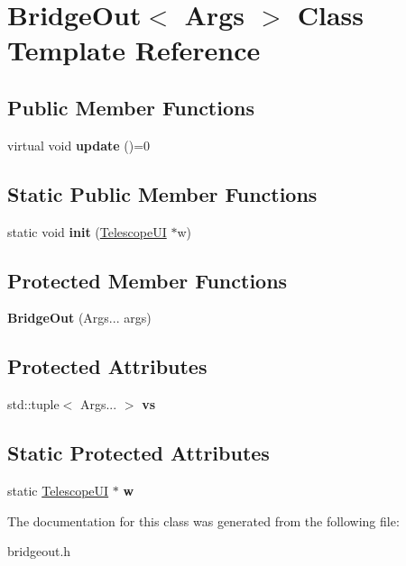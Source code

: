 \hypertarget{classBridgeOut}{}\section{Bridge\+Out$<$ Args $>$ Class Template Reference}
\label{classBridgeOut}
\subsection*{Public Member Functions}
\begin{DoxyCompactItemize}
\item 
\mbox{\label{classBridgeOut_ad87aac4b8b859708b67a07b2b626ed90}} 
virtual void {\bfseries update} ()=0
\end{DoxyCompactItemize}
\subsection*{Static Public Member Functions}
\begin{DoxyCompactItemize}
\item 
\mbox{\label{classBridgeOut_af917fa1c2f57ccb27e096b4a072c6ba2}} 
static void {\bfseries init} (\mbox{\hyperlink{classTelescopeUI}{Telescope\+UI}} $\ast$w)
\end{DoxyCompactItemize}
\subsection*{Protected Member Functions}
\begin{DoxyCompactItemize}
\item 
\mbox{\label{classBridgeOut_a5a2bee47cdb12aae80d962c08d76c812}} 
{\bfseries Bridge\+Out} (Args... args)
\end{DoxyCompactItemize}
\subsection*{Protected Attributes}
\begin{DoxyCompactItemize}
\item 
\mbox{\label{classBridgeOut_a534d0f81ee6c4e342d472919aeebbb7d}} 
std\+::tuple$<$ Args... $>$ {\bfseries vs}
\end{DoxyCompactItemize}
\subsection*{Static Protected Attributes}
\begin{DoxyCompactItemize}
\item 
\mbox{\label{classBridgeOut_a0ab24b2bd05e3140349b20a5812a8575}} 
static \mbox{\hyperlink{classTelescopeUI}{Telescope\+UI}} $\ast$ {\bfseries w}
\end{DoxyCompactItemize}


The documentation for this class was generated from the following file\+:\begin{DoxyCompactItemize}
\item 
bridgeout.\+h\end{DoxyCompactItemize}
